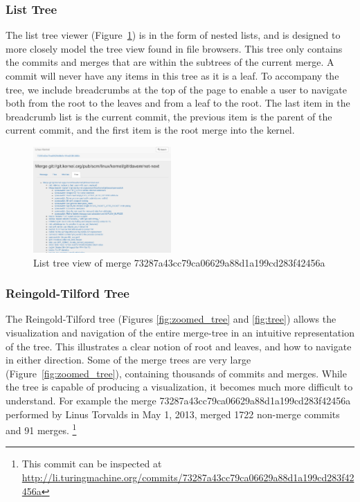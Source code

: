 \documentclass[conference, draftclsnofoot, draft]{IEEEtran}
\begin{document}
\subsubsection{List Tree}

The list tree viewer (Figure~\ref{fig:list_tree}) is in the form of nested lists,
and is designed to more closely model the tree view found in file browsers. This
tree only contains the commits and merges that are within the subtrees of the
current merge. A commit will never have any items in this tree as it is a leaf. To
accompany the tree, we include breadcrumbs at the top of the page to enable a user
to navigate both from the root to the leaves and from a leaf to the root. The last
item in the breadcrumb list is the current commit, the previous item is the parent
of the current commit, and the first item is the root merge into the kernel.

\begin{figure}
        \centering
        \includegraphics[width=0.47\textwidth]{figures/list_tree.png}
        \caption{List tree view of merge 73287a43cc79ca06629a88d1a199cd283f42456a}
        \label{fig:list_tree}
\end{figure}

\subsubsection{Reingold-Tilford Tree}

The Reingold-Tilford tree\cite{Reingold1981} (Figures \ref{fig:zoomed_tree} and
\ref{fig:tree}) allows the visualization and navigation of the entire merge-tree in
an intuitive representation of the tree.  This illustrates a clear notion of root
and leaves, and how to navigate in either direction. Some of the merge trees are
very large (Figure~\ref{fig:zoomed_tree}), containing thousands of commits and
merges. While the tree is capable of producing a visualization, it becomes much more
difficult to understand. For example the merge
73287a43cc79ca06629a88d1a199cd283f42456a performed by Linus Torvalds in May 1, 2013,
merged 1722 non-merge commits and 91 merges. \footnote{
        This commit can be inspected at
        \url{http://li.turingmachine.org/commits/73287a43cc79ca06629a88d1a199cd283f42456a}}
\end{document}
